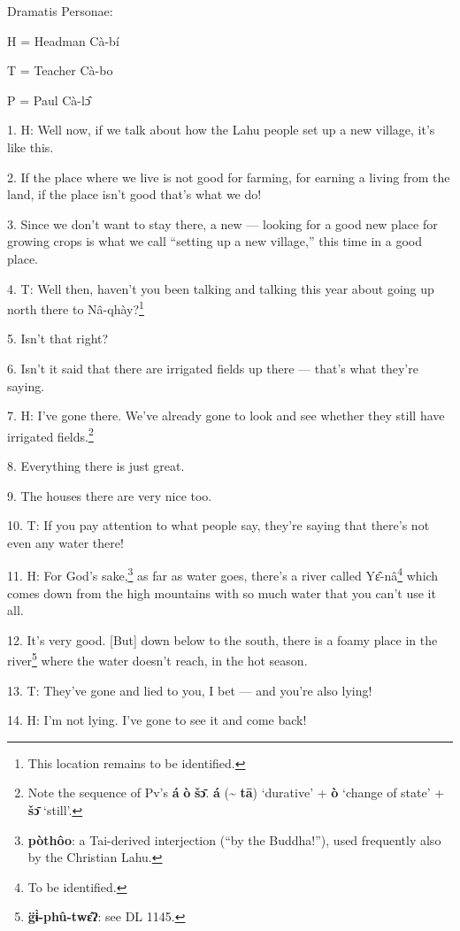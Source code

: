 \setcounter{footnote}{0}

Dramatis Personae:

H = Headman Cà-bí

T = Teacher Cà-bo

P = Paul Cà-lɔ̂

1. H: Well now, if we talk about how the Lahu people set up a new village, it's
like this.

2. If the place where we live is not good for farming, for earning a living from
the land, if the place isn't good that's what we do!

3. Since we don't want to stay there, a new --- looking for a good new place for
growing crops is what we call ``setting up a new village,'' this time in a good
place.

4. T: Well then, haven't you been talking and talking this year about going up
north there to Nâ-qhày?\footnote{This location remains to be identified.}

5. Isn't that right?

6. Isn't it said that there are irrigated fields up there --- that's what they're
saying.

7. H: I've gone there. We've already gone to look and see whether they still have
irrigated fields.\footnote{Note the sequence of Pv's \textbf{á} \textbf{ò} \textbf{šɔ̄}. \textbf{á} (\textasciitilde{} \textbf{tā}) `durative' + \textbf{ò} `change of state' + \textbf{šɔ̄} `still'.}

8. Everything there is just great.

9. The houses there are very nice too.

10. T: If you pay attention to what people say, they're saying that there's not
even any water there!

11. H: For God's sake,\footnote{\textbf{pòthôo}: a Tai-derived interjection (``by the Buddha!''), used frequently also by the Christian Lahu.} as far as water goes, there's a river called Yɛ̂-nâ\footnote{To be identified.}
which comes down from the high mountains with so much water that you can't use
it all.

12. It's very good. [But] down below to the south, there is a foamy place in the
river\footnote{\textbf{g̈ɨ̀-phû-twɛ̂ʔ}: see DL 1145.} where the water doesn't reach, in the hot season.

13. T: They've gone and lied to you, I bet --- and you're also lying!

14. H: I'm not lying. I've gone to see it and come back!

